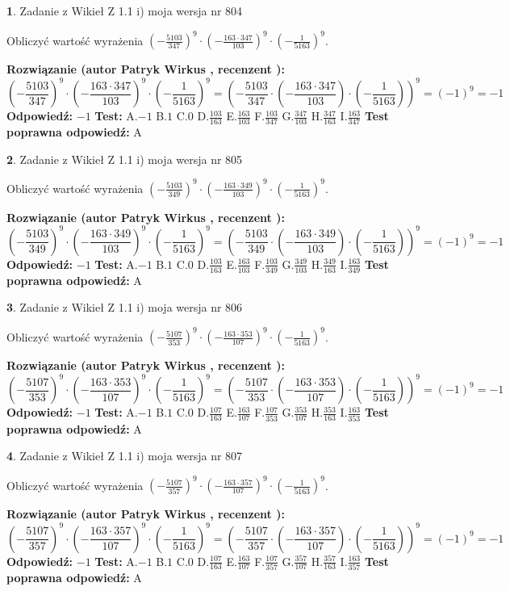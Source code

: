 \documentclass[12pt, a4paper]{article}
\theoremstyle{definition} %
\newtheorem{zad}{}
\newcommand{\zadStart}[1]{\begin{zad}#1\newline}
\newcommand{\zadStop}{\end{zad}}
\newcommand{\rozwStart}[2]{\noindent \textbf{Rozwiązanie (autor #1 , recenzent #2): }\newline}
\newcommand{\rozwStop}{\newline}
\newcommand{\odpStart}{\noindent \textbf{Odpowiedź:}\newline}
\newcommand{\odpStop}{\newline}
\newcommand{\testStart}{\noindent \textbf{Test:}\newline}
\newcommand{\testStop}{\newline}
\newcommand{\kluczStart}{\noindent \textbf{Test poprawna odpowiedź:}\newline}
\newcommand{\kluczStop}{\newline}
\begin{document}
\zadStart{Zadanie z Wikieł Z 1.1 i) moja wersja nr 804}

Obliczyć wartość wyrażenia $(-\frac{5103}{347})^{9} \cdot (-\frac{163 \cdot 347}{103})^{9} \cdot (-\frac{1}{5163})^{9}$.
\zadStop
\rozwStart{Patryk Wirkus}{}
$$(-\frac{5103}{347})^{9} \cdot (-\frac{163 \cdot 347}{103})^{9} \cdot (-\frac{1}{5163})^{9} = (-\frac{5103}{347} \cdot (-\frac{163 \cdot 347}{103}) \cdot (-\frac{1}{5163}))^{9} = (-1)^{9} = -1$$
\rozwStop
\odpStart
$-1$
\odpStop
\testStart
A.$-1$ B.$1$ C.$0$ D.$\frac{103}{163}$ E.$\frac{163}{103}$
F.$\frac{103}{347}$ G.$\frac{347}{103}$
H.$\frac{347}{163}$
I.$\frac{163}{347}$
\testStop
\kluczStart
A
\kluczStop



\zadStart{Zadanie z Wikieł Z 1.1 i) moja wersja nr 805}

Obliczyć wartość wyrażenia $(-\frac{5103}{349})^{9} \cdot (-\frac{163 \cdot 349}{103})^{9} \cdot (-\frac{1}{5163})^{9}$.
\zadStop
\rozwStart{Patryk Wirkus}{}
$$(-\frac{5103}{349})^{9} \cdot (-\frac{163 \cdot 349}{103})^{9} \cdot (-\frac{1}{5163})^{9} = (-\frac{5103}{349} \cdot (-\frac{163 \cdot 349}{103}) \cdot (-\frac{1}{5163}))^{9} = (-1)^{9} = -1$$
\rozwStop
\odpStart
$-1$
\odpStop
\testStart
A.$-1$ B.$1$ C.$0$ D.$\frac{103}{163}$ E.$\frac{163}{103}$
F.$\frac{103}{349}$ G.$\frac{349}{103}$
H.$\frac{349}{163}$
I.$\frac{163}{349}$
\testStop
\kluczStart
A
\kluczStop



\zadStart{Zadanie z Wikieł Z 1.1 i) moja wersja nr 806}

Obliczyć wartość wyrażenia $(-\frac{5107}{353})^{9} \cdot (-\frac{163 \cdot 353}{107})^{9} \cdot (-\frac{1}{5163})^{9}$.
\zadStop
\rozwStart{Patryk Wirkus}{}
$$(-\frac{5107}{353})^{9} \cdot (-\frac{163 \cdot 353}{107})^{9} \cdot (-\frac{1}{5163})^{9} = (-\frac{5107}{353} \cdot (-\frac{163 \cdot 353}{107}) \cdot (-\frac{1}{5163}))^{9} = (-1)^{9} = -1$$
\rozwStop
\odpStart
$-1$
\odpStop
\testStart
A.$-1$ B.$1$ C.$0$ D.$\frac{107}{163}$ E.$\frac{163}{107}$
F.$\frac{107}{353}$ G.$\frac{353}{107}$
H.$\frac{353}{163}$
I.$\frac{163}{353}$
\testStop
\kluczStart
A
\kluczStop



\zadStart{Zadanie z Wikieł Z 1.1 i) moja wersja nr 807}

Obliczyć wartość wyrażenia $(-\frac{5107}{357})^{9} \cdot (-\frac{163 \cdot 357}{107})^{9} \cdot (-\frac{1}{5163})^{9}$.
\zadStop
\rozwStart{Patryk Wirkus}{}
$$(-\frac{5107}{357})^{9} \cdot (-\frac{163 \cdot 357}{107})^{9} \cdot (-\frac{1}{5163})^{9} = (-\frac{5107}{357} \cdot (-\frac{163 \cdot 357}{107}) \cdot (-\frac{1}{5163}))^{9} = (-1)^{9} = -1$$
\rozwStop
\odpStart
$-1$
\odpStop
\testStart
A.$-1$ B.$1$ C.$0$ D.$\frac{107}{163}$ E.$\frac{163}{107}$
F.$\frac{107}{357}$ G.$\frac{357}{107}$
H.$\frac{357}{163}$
I.$\frac{163}{357}$
\testStop
\kluczStart
A
\kluczStop
\end{document}
